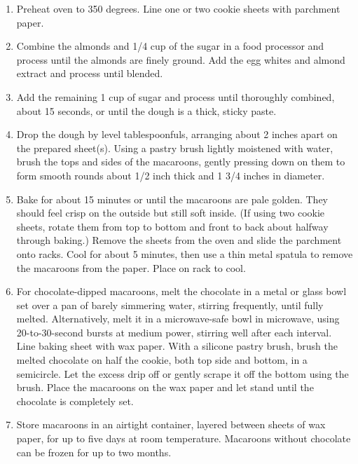 \documentclass[11pt, twoside, openany]{book}
\begin{document}
\vspace{-3mm}\begin{enumerate}\setlength\itemsep{-1mm}
\item Preheat oven to 350 degrees. Line one or two cookie sheets with parchment paper.
\item Combine the almonds and 1/4 cup of the sugar in a food processor and process until the almonds are finely ground. Add the egg whites and almond extract and process until blended.
\item Add the remaining 1 cup of sugar and process until thoroughly combined, about 15 seconds, or until the dough is a thick, sticky paste.
\item Drop the dough by level tablespoonfuls, arranging about 2 inches apart on the prepared sheet(s). Using a pastry brush lightly moistened with water, brush the tops and sides of the macaroons, gently pressing down on them to form smooth rounds about 1/2 inch thick and 1 3/4 inches in diameter.
\item Bake for about 15 minutes or until the macaroons are pale golden. They should feel crisp on the outside but still soft inside. (If using two cookie sheets, rotate them from top to bottom and front to back about halfway through baking.) Remove the sheets from the oven and slide the parchment onto racks. Cool for about 5 minutes, then use a thin metal spatula to remove the macaroons from the paper. Place on rack to cool.
\item For chocolate-dipped macaroons, melt the chocolate in a metal or glass bowl set over a pan of barely simmering water, stirring frequently, until fully melted. Alternatively, melt it in a microwave-safe bowl in microwave, using 20-to-30-second bursts at medium power, stirring well after each interval. Line baking sheet with wax paper. With a silicone pastry brush, brush the melted chocolate on half the cookie, both top side and bottom, in a semicircle. Let the excess drip off or gently scrape it off the bottom using the brush. Place the macaroons on the wax paper and let stand until the chocolate is completely set.
\item Store macaroons in an airtight container, layered between sheets of wax paper, for up to five days at room temperature. Macaroons without chocolate can be frozen for up to two months.
\end{enumerate}
 \label{extreme-chocolate-cake}\hfill\textit{}\\
\end{document}
